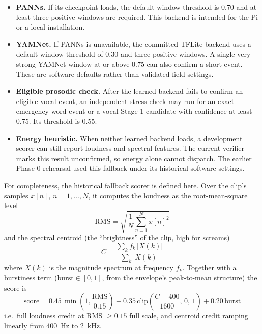 \documentclass[12pt,a4paper]{report}
\begin{document}
\begin{itemize}
\item \textbf{PANNs.} If its checkpoint loads, the default window
  threshold is 0.70 and at least three positive windows are required.
  This backend is intended for the Pi or a local installation.
\item \textbf{YAMNet.} If PANNs is unavailable, the committed TFLite
  backend uses a default window threshold of 0.30 and three positive
  windows. A single very strong YAMNet window at or above 0.75 can
  also confirm a short event. These are software defaults rather
  than validated field settings.
\item \textbf{Eligible prosodic check.} After the learned backend
  fails to confirm an eligible vocal event, an independent stress
  check may run for an exact emergency-word event or a vocal Stage-1
  candidate with confidence at least 0.75. Its threshold is 0.55.
\item \textbf{Energy heuristic.} When neither learned backend loads,
  a development scorer can still report loudness and spectral
  features. The current verifier marks this result unconfirmed, so
  energy alone cannot dispatch. The earlier Phase-0 rehearsal used
  this fallback under its historical software settings.
\end{itemize}

For completeness, the historical fallback scorer is defined here.
Over the clip's samples $x[n]$, $n = 1,\dots,N$, it
computes the loudness as the root-mean-square level
\begin{equation}
\label{eq:rms}
\mathrm{RMS} = \sqrt{\frac{1}{N}\sum_{n=1}^{N} x[n]^2}
\end{equation}
and the spectral centroid (the ``brightness'' of the clip, high for
screams)
\begin{equation}
\label{eq:centroid}
C = \frac{\sum_{k} f_k\,\lvert X(k)\rvert}{\sum_{k}\lvert X(k)\rvert}
\end{equation}
where $X(k)$ is the magnitude spectrum at frequency $f_k$. Together
with a burstiness term ($\mathrm{burst} \in [0,1]$, from the
envelope's peak-to-mean structure) the score is
\begin{equation}
\label{eq:fallbackscore}
\mathrm{score} = 0.45\,\min\!\left(1, \frac{\mathrm{RMS}}{0.15}\right)
+ 0.35\,\mathrm{clip}\!\left(\frac{C - 400}{1600},\,0,\,1\right)
+ 0.20\,\mathrm{burst}
\end{equation}
i.e.\ full loudness credit at RMS $\geq 0.15$ full scale, and centroid
credit ramping linearly from 400~Hz to 2~kHz.
\end{document}
